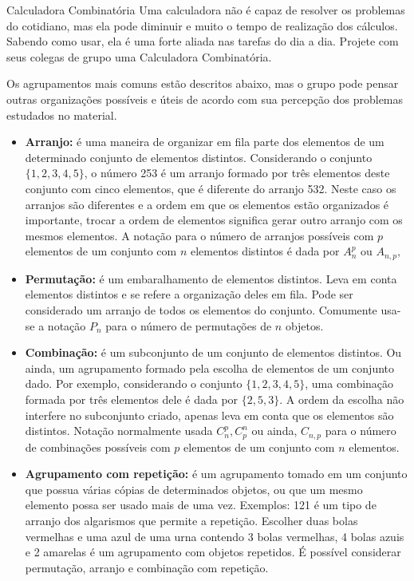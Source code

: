 \begin{task}{Calculadora Combinatória}
Uma calculadora não é capaz de resolver os problemas do cotidiano, mas ela pode diminuir e muito o tempo de realização dos cálculos. Sabendo como usar, ela é uma forte aliada nas tarefas do dia a dia. Projete com seus colegas de grupo uma Calculadora Combinatória.



Os agrupamentos mais comuns estão descritos abaixo, mas o grupo pode pensar outras organizações possíveis e úteis de acordo com sua percepção dos problemas estudados no material.

\begin{itemize}
\item \textbf{Arranjo:}  é uma maneira de organizar em fila parte dos elementos de um determinado conjunto de elementos distintos. Considerando o conjunto $\{1,2,3,4,5\}$, o número 253 é um arranjo formado por três elementos deste conjunto com cinco elementos, que é diferente do arranjo 532. Neste caso os arranjos são diferentes e a ordem em que os elementos estão organizados é importante, trocar a ordem de elementos significa gerar outro arranjo com os mesmos elementos. A notação para o número de arranjos possíveis com $p$ elementos de um conjunto com $n$ elementos distintos é  dada por $A_n^p$ ou  $A_{n,p},$ 


\item \textbf{Permutação:} é um embaralhamento de elementos distintos. Leva em conta elementos distintos e se refere a organização deles em fila. Pode ser considerado um arranjo de todos os elementos do conjunto. Comumente usa-se a notação $P_n$ para o número de permutações de $n$ objetos. 


\item \textbf{Combinação:} é um subconjunto de um conjunto de elementos distintos. Ou ainda, um agrupamento formado pela escolha de elementos de um conjunto dado. Por exemplo, considerando o conjunto $\{1,2,3,4,5\}$, uma combinação formada por três elementos dele é dada por $\{2,5,3\}$. A ordem da escolha não interfere no subconjunto criado, apenas leva em conta que os elementos são distintos.  Notação normalmente usada $C_n^p,C_p^n$ ou ainda, $C_{n,p}$ para o número de combinações possíveis com $p$ elementos de um conjunto com $n$ elementos. 


\item \textbf{Agrupamento com repetição:} é um agrupamento tomado em um conjunto que possua várias cópias de determinados objetos, ou que um mesmo elemento possa ser usado mais de uma vez. Exemplos: 121 é um tipo de arranjo dos algarismos que permite a repetição.  Escolher duas bolas vermelhas e uma azul de uma urna contendo 3 bolas vermelhas, 4 bolas azuis e 2 amarelas é um agrupamento com objetos repetidos. É possível considerar permutação, arranjo e combinação com repetição. 
\end{itemize}



\end{task}
